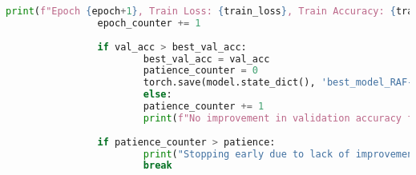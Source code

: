 \begin{lstlisting}[language=Python, caption={Python skript použitý na trenovanie modelu}, label={lst:training}]
                print(f"Epoch {epoch+1}, Train Loss: {train_loss}, Train Accuracy: {train_acc}, Test Loss: {test_loss}, Test Accuracy: {test_acc}, Val Loss: {val_loss}, Val Accuracy: {val_acc}")
                epoch_counter += 1
                
                if val_acc > best_val_acc:
                        best_val_acc = val_acc
                        patience_counter = 0 
                        torch.save(model.state_dict(), 'best_model_RAF-DB_1.pth')
                        else:
                        patience_counter += 1
                        print(f"No improvement in validation accuracy for {patience_counter} epochs.")
                
                if patience_counter > patience:
                        print("Stopping early due to lack of improvement in validation accuracy.")
                        break
\end{lstlisting}